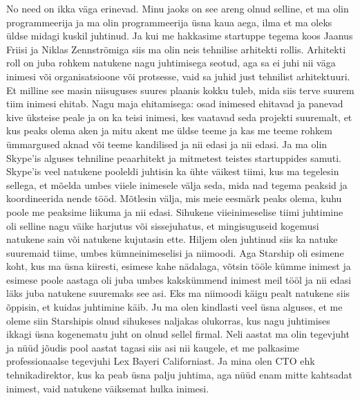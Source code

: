 
No need on ikka väga erinevad. Minu jaoks on see areng olnud selline, et ma 
olin programmeerija ja ma olin programmeerija üsna kaua aega, ilma et ma oleks 
üldse midagi kuskil juhtinud. Ja kui me hakkasime startuppe tegema koos Jaanus 
Friisi ja Niklas Zennströmiga siis ma olin 
neis tehnilise arhitekti rollis. Arhitekti roll on juba rohkem 
natukene nagu  juhtimisega seotud, aga sa ei juhi nii väga  inimesi või 
organisatsioone või protsesse, vaid sa juhid just tehnilist arhitektuuri. Et 
milline see masin niisuguses suures plaanis kokku tuleb, mida siis terve suurem 
tiim inimesi ehitab. Nagu maja ehitamisega: osad inimesed ehitavad ja panevad 
kive üksteise peale ja on ka teisi inimesi, kes vaatavad seda projekti 
suuremalt, et kus peaks olema aken ja mitu akent me üldse teeme ja kas 
me teeme rohkem ümmargused aknad või teeme kandilised  ja nii edasi ja nii 
edasi. Ja ma olin Skype'is alguses tehniline peaarhitekt ja 
mitmetest teistes startuppides samuti. Skype'is veel natukene pooleldi juhtisin 
ka ühte väikest tiimi, kus  ma tegelesin sellega, et mõelda umbes viiele 
inimesele välja seda, mida nad tegema peaksid ja koordineerida nende tööd. 
Mõtlesin välja, mis meie eesmärk peaks olema, kuhu poole me peaksime liikuma ja 
nii edasi. Sihukene viieinimeselise tiimi juhtimine oli selline 
nagu väike harjutus või  sissejuhatus, et mingisuguseid kogemusi natukene sain 
või natukene kujutasin ette. Hiljem olen juhtinud siis ka natuke suuremaid 
tiime, umbes kümneinimeselisi ja niimoodi. Aga Starship oli esimene koht, kus 
ma üsna kiiresti, esimese kahe nädalaga, võtsin tööle kümme inimest
ja esimese poole aastaga oli juba umbes kakskümmend inimest meil tööl ja 
nii edasi  läks juba natukene suuremaks see asi. Eks ma niimoodi käigu pealt 
natukene siis  õppisin, et  kuidas juhtimine käib. Ju ma olen kindlasti veel 
üsna  alguses, et me oleme siin Starshipis olnud sihukeses  naljakas 
olukorras, kus nagu juhtimises ikkagi üsna kogenematu juht on olnud sellel 
firmal. Neli aastat ma olin tegevjuht ja  nüüd jõudis pool aastat tagasi siis 
asi nii kaugele, et me palkasime  professionaalse tegevjuhi Lex 
Bayeri Californiast. Ja mina olen CTO ehk 
tehnikadirektor, kus ka peab üsna palju juhtima, aga nüüd enam mitte kahtsadat 
inimest, vaid natukene väiksemat hulka inimesi.

